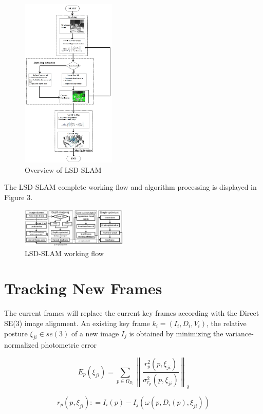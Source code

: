 \begin{figure}
  \centering
  \includegraphics[width=0.4\textwidth, height=0.6\textwidth]{figures/Fig2}
  \caption{Overview of LSD-SLAM}
\end{figure}

The LSD-SLAM complete working flow and algorithm processing is displayed in Figure 3.

\begin{figure}
  \centering
  \includegraphics[width=0.45\textwidth]{figures/Fig3(2)}
  \caption{LSD-SLAM working flow}
\end{figure}


\section{Tracking New Frames}
The current frames will replace the current key frames according with the Direct SE(3) image alignment. An existing key frame ${k_i} = ({I_i},{D_i},{V_i})$, the relative posture ${\xi _{ji}} \in se(3)$ of a new image ${I_j}$ is obtained by minimizing the variance-normalized photometric error

\begin{equation}
E_{p}(\xi _{ji}) = \sum\limits_{p \in \Omega _{D_{i}}} \left\|  \frac{r_{p}^{2} (p,\xi_{ji})}{\sigma_{r_{p}}^{2} (p,\xi_{ji})}  \right\|_{\delta}
\end{equation}


\begin{equation}
r_{p}(p,\xi _{ji}): = I_{i}(p) - I_{j}(\omega (p,D_{i}(p),\xi _{ji}))
\end{equation}


